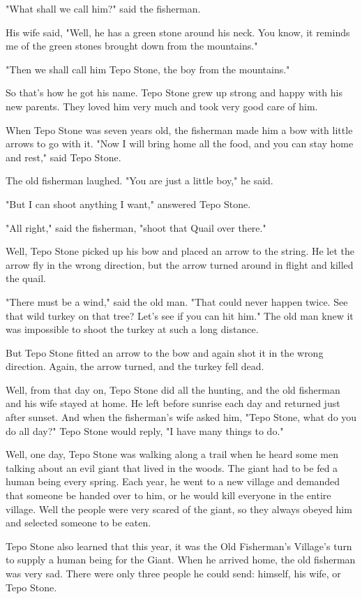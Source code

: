 "What shall we call him?" said the fisherman.

His wife said, "Well, he has a green stone around his neck. You know, it reminds me of the green stones brought down from the mountains."

"Then we shall call him Tepo Stone, the boy from the mountains."

So that's how he got his name. Tepo Stone grew up strong and happy with his new parents. They loved him very much and took very good care of him.

When Tepo Stone was seven years old, the fisherman made him a bow with little arrows to go with it. "Now I will bring home all the food, and you can stay home and rest," said Tepo Stone.

The old fisherman laughed. "You are just a little boy," he said.

"But I can shoot anything I want," answered Tepo Stone.

"All right," said the fisherman, "shoot that Quail over there."

Well, Tepo Stone picked up his bow and placed an arrow to the string. He let the arrow fly in the wrong direction, but the arrow turned around in flight and killed the quail.

"There must be a wind," said the old man. "That could never happen twice. See that wild turkey on that tree? Let's see if you can hit him." The old man knew it was impossible to shoot the turkey at such a long distance.

But Tepo Stone fitted an arrow to the bow and again shot it in the wrong direction. Again, the arrow turned, and the turkey fell dead.

Well, from that day on, Tepo Stone did all the hunting, and the old fisherman and his wife stayed at home. He left before sunrise each day and returned just after sunset. And when the fisherman's wife asked him, "Tepo Stone, what do you do all day?" Tepo Stone would reply, "I have many things to do."

Well, one day, Tepo Stone was walking along a trail when he heard some men talking about an evil giant that lived in the woods. The giant had to be fed a human being every spring. Each year, he went to a new village and demanded that someone be handed over to him, or he would kill everyone in the entire village. Well the people were very scared of the giant, so they always obeyed him and selected someone to be eaten.

Tepo Stone also learned that this year, it was the Old Fisherman's Village's turn to supply a human being for the Giant. When he arrived home, the old fisherman was very sad. There were only three people he could send: himself, his wife, or Tepo Stone.

